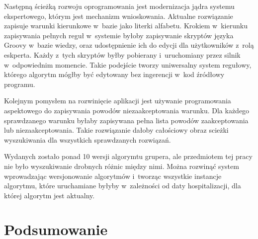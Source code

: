Następną ścieżką rozwoju oprogramowania jest modernizacja jądra systemu ekspertowego, którym jest mechanizm wnioskowania. Aktualne rozwiązanie zapisuje warunki kierunkowe w~bazie jako literki alfabetu. Krokiem w~kierunku zapisywania pełnych reguł w~systemie byłoby zapisywanie skryptów języka Groovy w~bazie wiedzy, oraz udostępnienie ich do edycji dla użytkowników z~rolą eskperta. Każdy z~tych skryptów byłby pobierany i~uruchomiany przez silnik w~odpowiednim momencie.
Takie podejście tworzy uniwersalny system regułowy, którego algorytm mógłby być edytowany bez ingerencji w~kod źródłowy programu.

Kolejnym pomysłem na rozwinięcie aplikacji jest używanie programowania aspektowego do zapisywania powodów niezaakceptowania warunku.
Dla każdego sprawdzanego warunku byłaby zapisywana pełna lista powodów zaakceptowania lub niezaakceptowania.
Takie rozwiązanie dałoby całościowy obraz scieżki wyszukiwania dla wszystkich sprawdzanych rozwiązań.

Wydanych zostało ponad 10 wersji algorymtu grupera, ale przedmiotem tej pracy nie było wyszukiwanie drobnych różnic między nimi. Można rozwinąć system wprowadzając wersjonowanie algorytmów i~tworząc wszystkie instancje algorytmu, które uruchamiane byłyby w~zależności od daty hospitalizacji, dla której algorytm jest aktualny.


\section{Podsumowanie}
\label{sec:podsumowanie}

